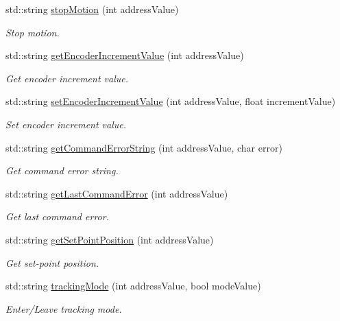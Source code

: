 \begin{DoxyCompactItemize}
std\+::string \hyperlink{namespaceconex_aa908bd9ff7a78d0b2bd7bcbe2ef7080c}{stop\+Motion} (int address\+Value)
\begin{DoxyCompactList}\small\item\em Stop motion. \end{DoxyCompactList}\item 
std\+::string \hyperlink{namespaceconex_a8614267e3ba2e2c44b44bcd30bbb84b0}{get\+Encoder\+Increment\+Value} (int address\+Value)
\begin{DoxyCompactList}\small\item\em Get encoder increment value. \end{DoxyCompactList}\item 
std\+::string \hyperlink{namespaceconex_a51a2f94e8cb024ecdc120c713dd19c7c}{set\+Encoder\+Increment\+Value} (int address\+Value, float increment\+Value)
\begin{DoxyCompactList}\small\item\em Set encoder increment value. \end{DoxyCompactList}\item 
std\+::string \hyperlink{namespaceconex_a09ba026f23e2caeb631a18230bcd8b45}{get\+Command\+Error\+String} (int address\+Value, char error)
\begin{DoxyCompactList}\small\item\em Get command error string. \end{DoxyCompactList}\item 
std\+::string \hyperlink{namespaceconex_a6a993799643f4e7a19f0da530e03213e}{get\+Last\+Command\+Error} (int address\+Value)
\begin{DoxyCompactList}\small\item\em Get last command error. \end{DoxyCompactList}\item 
std\+::string \hyperlink{namespaceconex_a785c9ad7e52441aef38faeccf75c1e5e}{get\+Set\+Point\+Position} (int address\+Value)
\begin{DoxyCompactList}\small\item\em Get set-\/point position. \end{DoxyCompactList}\item 
std\+::string \hyperlink{namespaceconex_a231ad931cd8782bcfd30f4b60ef2e3d8}{tracking\+Mode} (int address\+Value, bool mode\+Value)
\begin{DoxyCompactList}\small\item\em Enter/\+Leave tracking mode. \end{DoxyCompactList}\item 

\end{DoxyCompactItemize}
